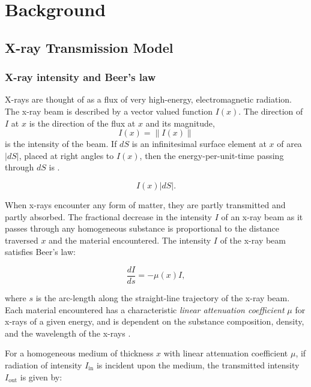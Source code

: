 \documentclass[nomenclature, english, bibtex]{kththesis}
\numberwithin{listing}{chapter}
\begin{document}
\chapter{Background}

\section{X-ray Transmission Model}
\label{sec:xrayTransmissionModel}

\subsection{X-ray intensity and Beer's law}

X-rays are thought of as a flux of very high-energy, electromagnetic radiation. The x-ray beam is
described by a vector valued function $I(x)$. The direction of $I$ at $x$ is the direction of the flux at $x$ and
its magnitude,
\begin{equation}
    I (x) = \lVert I(x) \rVert
\end{equation}
is the intensity of the beam. If $dS$ is an infinitesimal surface element at $x$ of area
$|dS|$, placed at right angles to $I(x)$, then the energy-per-unit-time passing through $dS$ is \cite[p.~56]{epstein2008}.

\begin{equation}
    I (x) |dS|.
\end{equation}

When x-rays encounter any form of matter, they are partly transmitted and partly absorbed.
The fractional decrease in the intensity $I$ of an x-ray beam as it passes
through any homogeneous substance is proportional to the distance traversed $x$
and the material encountered\cite[p.~11]{cullityElementsXrayDiffraction2014}. The intensity
$I$ of the x-ray beam satisfies Beer's law:

\begin{equation}
    \frac{dI}{ds} = -\mu(x)I,
    \label{eq:BeerLambert}
\end{equation}

where $s$ is the arc-length along the straight-line trajectory of the x-ray beam.
Each material encountered has a characteristic \textit{linear attenuation coefficient} $\mu$ for x-rays of a
given energy, and is dependent on the substance composition, density, and the wavelength of the x-rays \cite[p.~57]{epstein2008}.

For a homogeneous medium of thickness $x$ with linear attenuation coefficient $\mu$, if radiation of intensity
$I_{\text{in}}$ is incident upon the medium, the transmitted intensity $I_{\text{out}}$ is given by:
\end{document}
